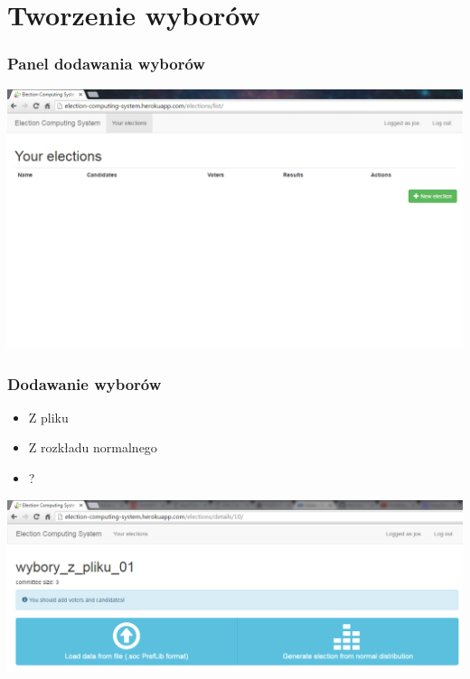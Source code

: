 \documentclass{beamer}
\begin{document}
\section{Tworzenie wyborów}
\begin{frame}
\frametitle{Panel dodawania wyborów}
\begin{center}
\includegraphics[width=0.8\paperwidth]{screenshots/04_new_elections.png}
\end{center}
\end{frame}
\begin{frame}
\frametitle{Dodawanie wyborów}
\begin{itemize}
	\item Z pliku
	\item Z rozkładu normalnego
	\item ?
\end{itemize}
\begin{center}
	\includegraphics[width=0.8\paperwidth]{screenshots/06_add_election.png}
\end{center}
\end{frame}
\end{document}

